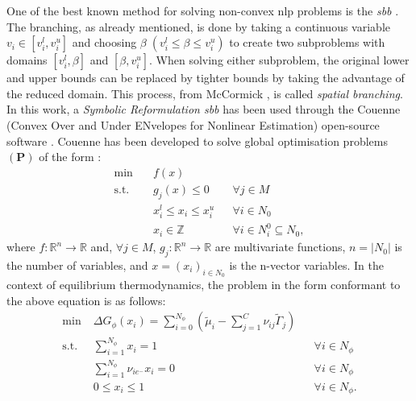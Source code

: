 One of the best known method for solving non-convex \gls{nlp} problems is the \emph{\gls{sbb}} \cite{Smith:1996aa,Tawarmalani:2013aa}. The branching, as already mentioned, is done by taking a continuous variable $v_i \in \left[v_i^l , v_i^u \right]$ and choosing $\beta \; (v_i^l \leq \beta \leq v_i^u)$ to create two subproblems with domains $\left[v_i^l , \beta \right]$ and $\left[\beta , v_i^u \right]$. When solving either subproblem, the original lower and upper bounds can be replaced by tighter bounds by taking the advantage of the reduced domain. This process, from McCormick \cite{McCormick:1976aa}, is called \emph{spatial branching}.
In this work, a \emph{Symbolic Reformulation \gls{sbb}} \cite{Smith:1996aa,Smith:1997ab,Smith:1999aa} has been used through the Couenne (Convex Over and Under ENvelopes for Nonlinear Estimation) open-source software \cite{Belotti:2009aa,Belotti:2022aa}. Couenne has been developed to solve global optimisation problems $(\mathbf{P})$  of the form \cite{Belotti:2009aa}:
\begin{equation} \label{eq:couenne_prob}
\begin{aligned}
	\min \quad &f(x)			& \\
	\text{s.t.} \quad &g_j(x) \leq 0  	& &\forall j \in M \\
	&x_i^l \leq x_i \leq x_i^u	& &\forall i \in N_0 \\
	& x_i \in \mathbb{Z}		& &\forall i \in N_i^0 \subseteq N_0,
\end{aligned}
\end{equation}
where $f : \mathbb{R}^n \rightarrow \mathbb{R}$ and, $\forall j \in M$, $g_j : \mathbb{R}^n \rightarrow \mathbb{R}$ are multivariate functions, $n = \left|N_0\right|$ is the number of variables, and $x = (x_i)_{i \in N_0}$ is the n-vector variables. In the context of equilibrium thermodynamics, the problem in the form conformant to the above equation is as follows:
\begin{equation}
\begin{aligned}
	\min \; & \Delta G_\phi(x_i) = \sum_{i=0}^{N_\phi} \left( \tilde{\mu}_i - \sum_{j=1}^{C} \nu_{ij}\tilde{\Gamma}_j \right)		& \\
	\text{s.t.} \; &\sum_{i=1}^{N_\phi} x_i = 1  	& &\forall i \in N_\phi \\
			&\sum_{i=1}^{N_\phi} \nu_{i{e^-}} x_i = 0 & &\forall i \in N_\phi \\
	&0 \leq x_i \leq 1	& & \forall i \in N_\phi.
\end{aligned}
\end{equation}
